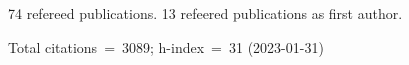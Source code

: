 74 refereed publications. 13 refeered publications as first author.

Total citations~=~3089; h-index~=~31 (2023-01-31)
